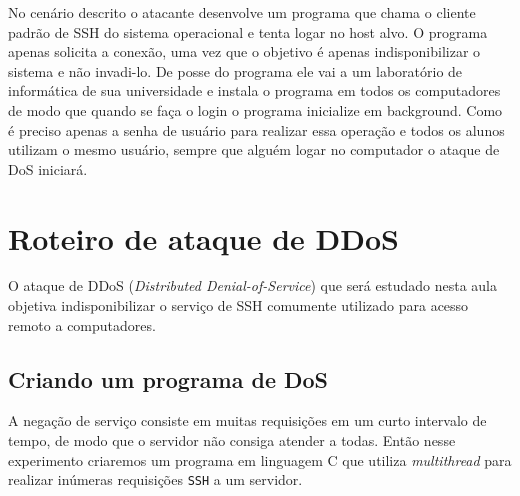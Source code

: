 \documentclass[12pt]{abnt}
\begin{document}
No cenário descrito o atacante desenvolve um programa que chama o cliente padrão de SSH do sistema operacional e tenta logar no host alvo. O programa
apenas solicita a conexão, uma vez que o objetivo é apenas indisponibilizar o sistema e não invadi-lo.
De posse do programa ele vai a um laboratório de informática de sua universidade e instala o programa em todos os computadores de modo que
quando se faça o login o programa inicialize em background. Como é preciso apenas a senha de usuário para realizar essa operação e todos
os alunos utilizam o mesmo usuário, sempre que alguém logar no computador o ataque de DoS iniciará.

\chapter{Roteiro de ataque de DDoS}

O ataque de DDoS (\textit{Distributed Denial-of-Service}) que será estudado nesta aula objetiva indisponibilizar o serviço de SSH comumente
utilizado para acesso remoto a computadores.

\section{Criando um programa de DoS}
\label{programa}

A negação de serviço consiste em muitas requisições em um curto intervalo de tempo, de modo que o servidor não consiga atender a todas. Então nesse
experimento criaremos um programa em linguagem C que utiliza \textit{multithread} para realizar inúmeras requisições \texttt{SSH} a um servidor.
\end{document}
